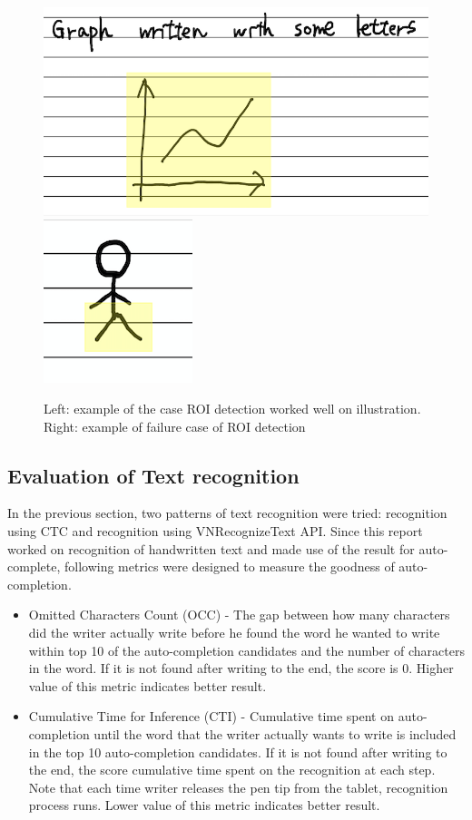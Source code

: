\begin{figure}
    \centering
    \includegraphics[scale=0.4]{images/illustration.png}
    \includegraphics[scale=0.9]{images/failure.png}
    \caption{Left: example of the case ROI detection worked well on illustration. Right: example of failure case of ROI detection}
    \label{fig:failure}
\end{figure}

\subsection{Evaluation of Text recognition}
In the previous section, two patterns of text recognition were tried: recognition using
CTC and recognition using VNRecognizeText API. Since this report worked on recognition of
handwritten text and made use of the result for auto-complete, following metrics were
designed to measure the goodness of auto-completion.

\begin{itemize}
    \item Omitted Characters Count (OCC) - The gap between how many characters did the writer actually write before
    he found the word he wanted to write within top 10 of the auto-completion candidates
    and the number of characters in the word.
    If it is not found after writing to the end, the score is 0. Higher value of this metric indicates better result.
    \item Cumulative Time for Inference (CTI) - Cumulative time spent on auto-completion until the word that the writer actually
    wants to write is included in the top 10 auto-completion candidates. If it is not found after writing to the end,
    the score cumulative time spent on the recognition at each step. Note that each time writer releases the pen tip from the tablet, recognition
    process runs. Lower value of this metric indicates better result.
\end{itemize}


